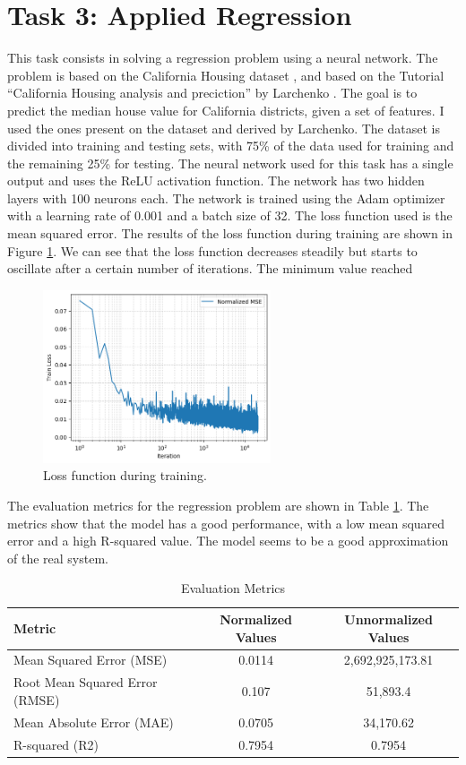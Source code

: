 \documentclass[unicode,11pt,a4paper,oneside,numbers=endperiod,openany]{scrartcl}
\begin{document}
\section{Task 3: Applied Regression}
This task consists in solving a regression problem using a neural network. The
problem is based on the California Housing dataset \cite{wang_california_housing_1990}, and based on the Tutorial
``California Housing analysis and preciction'' by Larchenko \cite{Larchenko2019}
. The goal is to predict the
median house value for California districts, given a set of features. I used the
ones present on the dataset and derived by Larchenko. The
dataset is divided into training and testing sets, with 75\% of the data used
for training and the remaining 25\% for testing. The neural network used for
this task has a single output and uses the ReLU activation function. The network
has two hidden layers with 100 neurons each. The network is trained using the
Adam optimizer with a learning rate of 0.001 and a batch size of 32. The loss
function used is the mean squared error. 
The results of the loss function during training are shown in Figure
\ref{fig:task3_loss}. We can see that the loss function decreases steadily but
starts to oscillate after a certain number of iterations. The minimum value reached
\begin{figure}[h]
    \centering
    \includegraphics[width=0.6\textwidth]{../Proj1_Y24/Task3/loss.png}
    \caption{Loss function during training.}
    \label{fig:task3_loss}
\end{figure}
The evaluation metrics for the regression problem are shown in Table \ref{tab:evaluation_metrics}. The metrics show that the model has a good performance, with a low mean squared error and a high R-squared value. The model seems to be a good approximation of the real system.
\begin{table}[h]
    \centering
    \caption{Evaluation Metrics}
    \begin{tabular}{lcc}
        \hline
        \textbf{Metric} & \textbf{Normalized Values} & \textbf{Unnormalized Values} \\ \hline
        Mean Squared Error (MSE) & 0.0114 & 2,692,925,173.81 \\
        Root Mean Squared Error (RMSE) & 0.107 & 51,893.4 \\
        Mean Absolute Error (MAE) & 0.0705 & 34,170.62 \\
        R-squared (R2) & 0.7954 & 0.7954 \\ \hline
    \end{tabular}
    \label{tab:evaluation_metrics}
\end{table}




\end{document}
